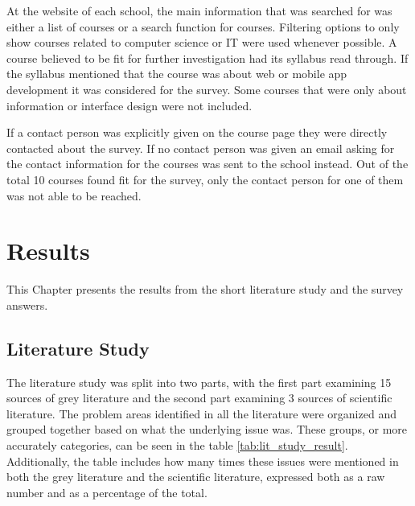\documentclass[a4paper,12pt]{article}
\begin{document}
At the website of each school, the main information that was searched for was either a list of courses or a search function for courses. Filtering options to only show courses related to computer science or IT were used whenever possible. A course believed to be fit for further investigation had its syllabus read through. If the syllabus mentioned that the course was about web or mobile app development it was considered for the survey. Some courses that were only about information or interface design were not included.

If a contact person was explicitly given on the course page they were directly contacted about the survey. If no contact person was given an email asking for the contact information for the courses was sent to the school instead. Out of the total 10 courses found fit for the survey, only the contact person for one of them was not able to be reached.


\newpage
\section{Results}
This Chapter presents the results from the short literature study and the survey answers.

\subsection{Literature Study}
The literature study was split into two parts, with the first part examining 15 sources of grey literature and the second part examining 3 sources of scientific literature. The problem areas identified in all the literature were organized and grouped together based on what the underlying issue was. These groups, or more accurately categories, can be seen in the table \ref{tab:lit_study_result}. Additionally, the table includes how many times these issues were mentioned in both the grey literature and the scientific literature, expressed both as a raw number and as a percentage of the total.
\end{document}
